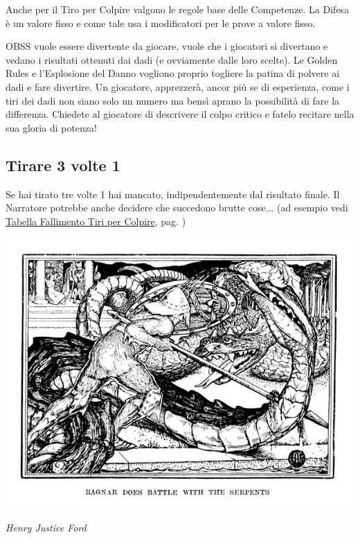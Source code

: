 \begin{multicols}{2}
Anche per il Tiro per Colpire valgono le regole base delle Competenze. La Difesa è un valore fisso e come tale usa i modificatori per le prove a valore fisso.

\begin{narratore}[Partecipazione]
OBSS vuole essere divertente da giocare, vuole che i giocatori si divertano e vedano i risultati ottenuti dai dadi (e ovviamente dalle loro scelte). Le Golden Rules e l'Esplosione del Danno vogliono proprio togliere la patina di polvere ai dadi e fare divertire. Un giocatore, apprezzerà, ancor più se di esperienza, come i tiri dei dadi non siano solo un numero ma bensì aprano la possibilità di fare la differenza. Chiedete al giocatore di descrivere il colpo critico e fatelo recitare nella sua gloria di potenza!
\end{narratore}

\subsection{Tirare 3 volte 1}\label{tiraretrevolteuno}

Se hai tirato tre volte 1 hai mancato, indipendentemente dal risultato finale. Il Narratore potrebbe anche decidere che succedono brutte cose... (ad esempio vedi \hyperlink{tabellafallimentiarmi}{Tabella Fallimento Tiri per Colpire}, pag. \pageref{tabellafallimentiarmi})

\begin{center}
	\includegraphics[width=0.9\linewidth]{immagini/critico.png}

	\emph{Henry Justice Ford}
\end{center}



\end{multicols}
